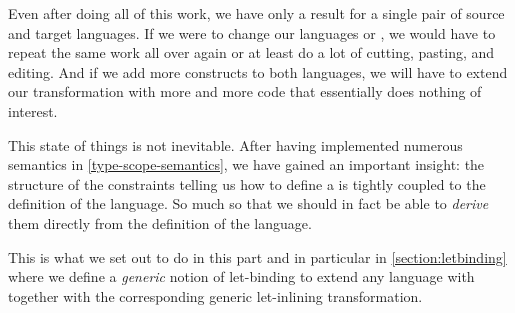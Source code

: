 Even after doing all of this work, we have only a result for a single pair of
source and target languages. If we were to change our languages  or
, we would have to repeat the same work all over again or at least do a
lot of cutting, pasting, and editing. And if we add more constructs to both
languages, we will have to extend our transformation with more and more code
that essentially does nothing of interest.

This state of things is not inevitable. After having implemented numerous
semantics in \cref{type-scope-semantics}, we have gained an important insight:
the structure of the constraints telling us how to define a  is
tightly coupled to the definition of the language. So much so that we should
in fact be able to \emph{derive} them directly from the definition of the
language.

This is what we set out to do in this part and in particular in
\cref{section:letbinding} where we define a \emph{generic} notion of
let-binding to extend any language with together with the corresponding
generic let-inlining transformation.
